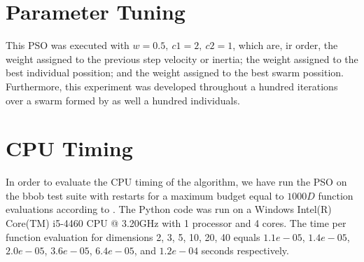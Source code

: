 \documentclass[sigconf]{acmart}
\begin{document}




\maketitle





\section{Parameter Tuning}
This PSO was executed with $w=0.5,~c1=2,~c2=1$, which are, ir order, the weight assigned to the previous step velocity or inertia; the weight assigned to the best individual possition; and the weight assigned to the best swarm possition. Furthermore, this experiment was developed throughout a hundred iterations over a swarm formed by as well a hundred individuals.
\section{CPU Timing}
In order to evaluate the CPU timing of the algorithm, we have run the PSO on the bbob test suite \cite{hansen2009fun} with restarts for a maximum budget equal to $1000 D$ function evaluations according to \cite{hansen2016exp}. The Python code was run on a Windows Intel(R) Core(TM) i5-4460 CPU @ 3.20GHz with 1 processor and 4 cores. The time per function evaluation for dimensions 2, 3, 5, 10, 20, 40 equals $1.1e-05$, $1.4e-05$, $2.0e-05$, $3.6e-05$, $6.4e-05$, and $1.2e-04$ seconds respectively.
\end{document}
